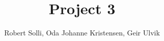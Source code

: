 \usepackage{amsmath}
\usepackage{listings}
\usepackage{graphicx}
\usepackage{caption}
\usepackage{subcaption}
\usepackage{commath}
\usepackage{hyperref}
\usepackage{xcolor}
\usepackage{textcomp}
\usepackage{dirtytalk}


\title{Project 3}
\author{Robert Solli, Oda Johanne Kristensen, Geir Ulvik}
\maketitle











